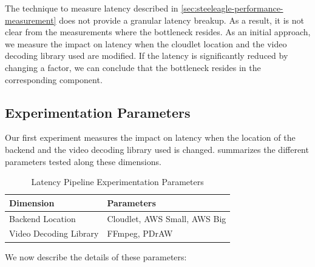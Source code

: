 The technique to measure latency described in
\cref{sec:steeleagle-performance-measurement} does not provide a granular
latency breakup. As a result, it is not clear from the measurements where the
bottleneck resides. As an initial approach, we measure the impact on latency
when the cloudlet location and the video decoding library used are modified. If
the latency is significantly reduced by changing a factor, we can conclude that
the bottleneck resides in the corresponding component.

\subsection{Experimentation Parameters}

Our first experiment measures the impact on latency when the location of the
backend and the video decoding library used is changed.
 summarizes the different parameters tested
along these dimensions.
\begin{table}[htbp]
    \centering
    \caption{Latency Pipeline Experimentation Parameters}
    \label{tab:experiment-parameters}
    \begin{tabular}{@{}ll@{}}
        \toprule
        \textbf{Dimension} & \textbf{Parameters} \\ \midrule
        Backend Location & Cloudlet, AWS Small, AWS Big \\
        Video Decoding Library & FFmpeg, PDrAW \\ \bottomrule
    \end{tabular}
\end{table}

We now describe the details of these parameters:

